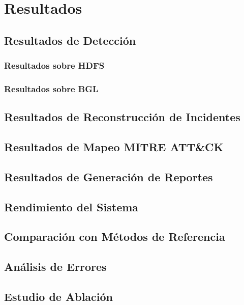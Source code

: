 \chapter{Resultados}

\section{Resultados de Detección}

\subsection{Resultados sobre HDFS}

\subsection{Resultados sobre BGL}

\section{Resultados de Reconstrucción de Incidentes}

\section{Resultados de Mapeo MITRE ATT\&CK}

\section{Resultados de Generación de Reportes}

\section{Rendimiento del Sistema}

\section{Comparación con Métodos de Referencia}

\section{Análisis de Errores}

\section{Estudio de Ablación}